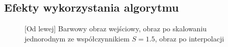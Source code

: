 \documentclass[a4paper,12pt, titlepage]{report}
\begin{document}
\subsection*{Efekty wykorzystania algorytmu}
\begin{figure}[h]
    \centering
    \caption{[Od lewej] Barwowy obraz wejściowy, obraz po skalowaniu jednorodnym ze współczynnikiem \(S=1.5\), obraz po interpolacji}%
    \label{fig:geo_after_grey1}%
\end{figure}
\FloatBarrier
\end{document}
